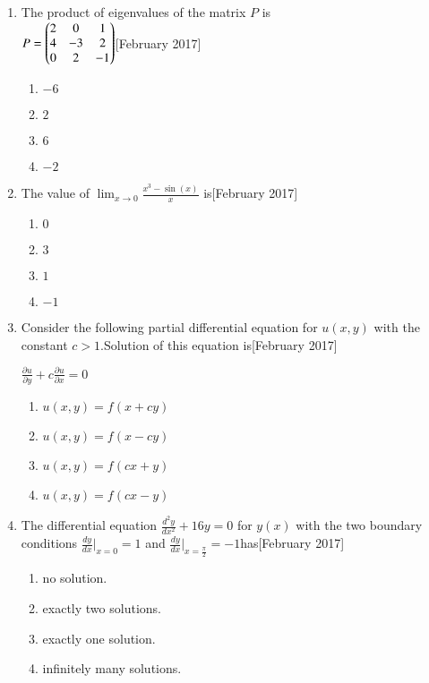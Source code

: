 \documentclass[journal]{IEEEtran}
\begin{document}
\begin{enumerate}
\item The product of eigenvalues of the matrix $P$ is \\
$P = \begin{pmatrix}2 & 0 & 1 \\ 4 & -3 & 2 \\ 0 & 2 & -1\end{pmatrix} $\hfill[February 2017]
\begin{enumerate}
    \item $-6$
    \item $2$
    \item $6$
    \item $-2$
\end{enumerate}
\item The value of $ \lim_{x \to 0} \frac{x^3 - \sin(x)}{x} $ is\hfill[February 2017]
\begin{enumerate}
    \item $0$
    \item $3$
    \item $1$
    \item $-1$
\end{enumerate}
\item Consider the following partial differential equation for  $u(x, y)$ with the \\ constant $c > 1$.Solution of this equation is\hfill[February 2017]
\begin{center}
$\frac{\partial u}{\partial y} + c \frac{\partial u}{\partial x} = 0$
\end{center}
\begin{enumerate}
    \item$ u(x, y) = f(x + cy)$
    \item$ u(x, y) = f(x - cy) $
    \item$ u(x, y) = f(cx + y) $
    \item$ u(x, y) = f(cx - y) $
\end{enumerate}
\item The differential equation $ \frac{d^2 y}{dx^2} + 16y = 0 $ for $y(x)$ with the two boundary conditions $\frac{dy}{dx}|_{x=0} = 1 $ and $\frac{dy}{dx}|_{x=\frac{\pi}{2}} = -1 $has\hfill[February 2017]
\begin{enumerate}
    \item no solution.
    \item exactly two solutions.
    \item exactly one solution.
    \item infinitely many solutions.
\end{enumerate}

\end{enumerate}
\end{document}
